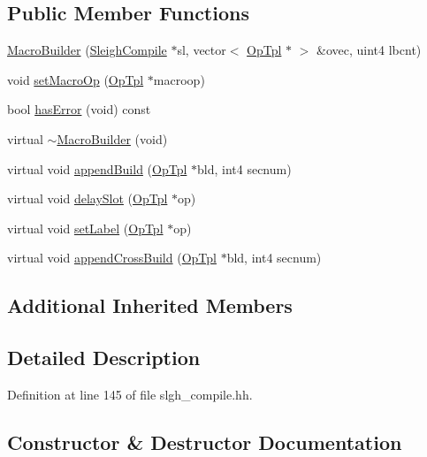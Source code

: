 \subsection*{Public Member Functions}
\begin{DoxyCompactItemize}
\item 
\mbox{\hyperlink{class_macro_builder_a48f0c264b4f17a41459af1107729a457}{Macro\+Builder}} (\mbox{\hyperlink{class_sleigh_compile}{Sleigh\+Compile}} $\ast$sl, vector$<$ \mbox{\hyperlink{class_op_tpl}{Op\+Tpl}} $\ast$ $>$ \&ovec, uint4 lbcnt)
\item 
void \mbox{\hyperlink{class_macro_builder_a394a95a6f96e016453a33734f132ae59}{set\+Macro\+Op}} (\mbox{\hyperlink{class_op_tpl}{Op\+Tpl}} $\ast$macroop)
\item 
bool \mbox{\hyperlink{class_macro_builder_ab47825f0c698322b575632e3b99fec81}{has\+Error}} (void) const
\item 
virtual \mbox{\hyperlink{class_macro_builder_a9a59534f6b32a891abc84d5006f320d5}{$\sim$\+Macro\+Builder}} (void)
\item 
virtual void \mbox{\hyperlink{class_macro_builder_a03bea914f6f63a779c6dd7c6d547c5d8}{append\+Build}} (\mbox{\hyperlink{class_op_tpl}{Op\+Tpl}} $\ast$bld, int4 secnum)
\item 
virtual void \mbox{\hyperlink{class_macro_builder_afadaa2541aeb61997f74b606c5cadf06}{delay\+Slot}} (\mbox{\hyperlink{class_op_tpl}{Op\+Tpl}} $\ast$op)
\item 
virtual void \mbox{\hyperlink{class_macro_builder_a5ea6a3fd6be762cc3d05851e59b22b79}{set\+Label}} (\mbox{\hyperlink{class_op_tpl}{Op\+Tpl}} $\ast$op)
\item 
virtual void \mbox{\hyperlink{class_macro_builder_a82c903d7c450eb1f5a503e85c4f8218f}{append\+Cross\+Build}} (\mbox{\hyperlink{class_op_tpl}{Op\+Tpl}} $\ast$bld, int4 secnum)
\end{DoxyCompactItemize}
\subsection*{Additional Inherited Members}


\subsection{Detailed Description}


Definition at line 145 of file slgh\+\_\+compile.\+hh.



\subsection{Constructor \& Destructor Documentation}
\mbox{\label{class_macro_builder_a48f0c264b4f17a41459af1107729a457}} 
